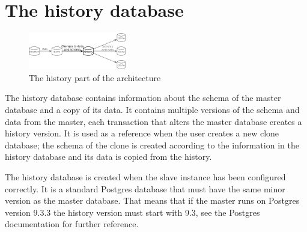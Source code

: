 \section{The history database}

\begin{figure}
  \vspace{-20pt}
  \begin{center}
    \includegraphics[width=0.38\textwidth]{img/architecture-history}
  \end{center}
  \vspace{-20pt}
  \caption{The history part of the architecture}
  \vspace{-10pt}
\end{figure}

The history database contains information about the schema of the master database and a copy of its data.
It contains multiple versions of the schema and data from the master, each transaction that alters the master database creates a history version.
It is used as a reference when the user creates a new clone database; the schema of the clone is created according to the information in the history database and its data is copied from the history.

The history database is created when the slave instance has been configured correctly.
It is a standard Postgres database that must have the same minor version as the master database.
That means that if the master runs on Postgres version 9.3.3 the history version must start with 9.3, see the Postgres documentation for further reference. %




